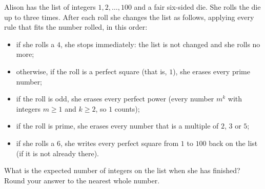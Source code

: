 Alison has the list of integers $1,2,\dots,100$ and a fair six-sided die. She rolls the die up to three times. After each roll she changes the list as follows, applying every rule that fits the number rolled, in this order:
\begin{itemize}
\item if she rolls a $4$, she stops immediately: the list is not changed and she rolls no more;
\item otherwise, if the roll is a perfect square (that is, $1$), she erases every prime number;
\item if the roll is odd, she erases every perfect power (every number $m^k$ with integers $m\ge1$ and $k\ge2$, so $1$ counts);
\item if the roll is prime, she erases every number that is a multiple of $2$, $3$ or $5$;
\item if she rolls a $6$, she writes every perfect square from $1$ to $100$ back on the list (if it is not already there).
\end{itemize}
What is the expected number of integers on the list when she has finished? Round your answer to the nearest whole number.
